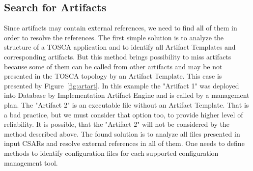\subsection{Search for Artifacts}\label{subs:searchart}
Since artifacts may contain external references, we need to find all of them in order to resolve the references.
The first simple solution is to analyze the structure of a TOSCA application and to identify all Artifact Templates and corresponding artifacts.
But this method brings possibility to miss artifacts because some of them can be called from other artifacts and may be not presented in the TOSCA topology by an Artifact Template.
This case is presented by Figure~\ref{fig:artart}.
In this example the "Artifact 1" was deployed into Database by Implementation Artifact Engine and is called by a management plan.
The "Artifact 2" is an executable file without an Artifact Template.
That is a bad practice, but we must consider that option too, to provide higher level of reliability.
It is possible, that the "Artifact 2" will not be considered by the method described above.
The found solution is to analyze all files presented in input CSARs and resolve external references in all of them.
One needs to define methods to identify configuration files for each supported configuration management tool.


